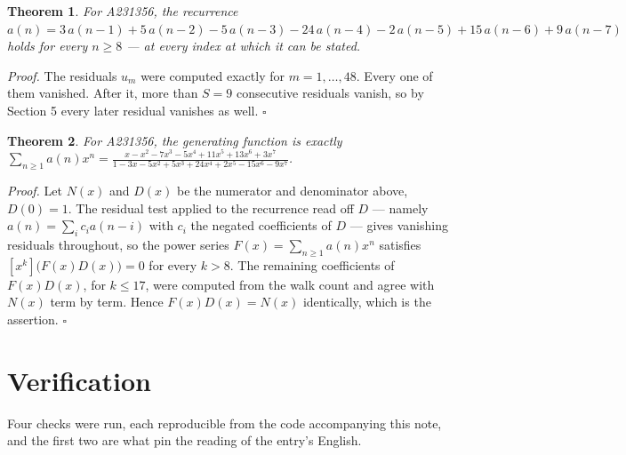 \documentclass[11pt]{article}
\newtheorem{theorem}{Theorem}
\theoremstyle{definition}
\begin{document}
\begin{theorem} For A231356, the recurrence $a(n) = 3\,a(n-1) + 5\,a(n-2) - 5\,a(n-3) - 24\,a(n-4) - 2\,a(n-5) + 15\,a(n-6) + 9\,a(n-7)$ holds for every $n \ge 8$ --- at every index at which it can be stated.\end{theorem}

{\itshape Proof.} The residuals $u_m$ were computed exactly for $m = 1,\dots,48$. Every one of them vanished. After it, more than $S = 9$ consecutive residuals vanish, so by Section 5 every later residual vanishes as well. $\square$

\begin{theorem} For A231356, the generating function is exactly $\sum_{n\ge 1} a(n)x^n = \frac{x - x^{2} - 7x^{3} - 5x^{4} + 11x^{5} + 13x^{6} + 3x^{7}}{1 - 3x - 5x^{2} + 5x^{3} + 24x^{4} + 2x^{5} - 15x^{6} - 9x^{7}}$.\end{theorem}

{\itshape Proof.} Let $N(x)$ and $D(x)$ be the numerator and denominator above, $D(0)=1$. The residual test applied to the recurrence read off $D$ --- namely $a(n) = \sum_i c_i a(n-i)$ with $c_i$ the negated coefficients of $D$ --- gives vanishing residuals throughout, so the power series $F(x)=\sum_{n\ge 1}a(n)x^n$ satisfies $[x^k]\bigl(F(x)D(x)\bigr) = 0$ for every $k > 8$. The remaining coefficients of $F(x)D(x)$, for $k \le 17$, were computed from the walk count and agree with $N(x)$ term by term. Hence $F(x)D(x) = N(x)$ identically, which is the assertion. $\square$

\section{Verification}

Four checks were run, each reproducible from the code accompanying this note, and the first two are what pin the reading of the entry's English.
\end{document}
